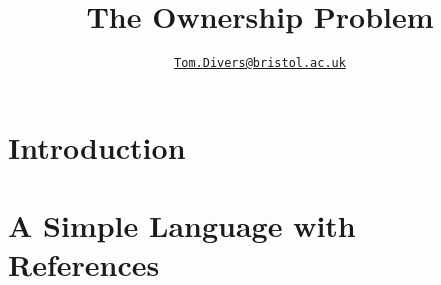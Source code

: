 \documentclass{article}
\title{The Ownership Problem}
\author{\href{mailto:oi24939@bristol.ac.uk}{\texttt{Tom.Divers@bristol.ac.uk}}}
\date{}
\begin{document}
\maketitle

\section{Introduction}

\section{A Simple Language with References}
\end{document}
